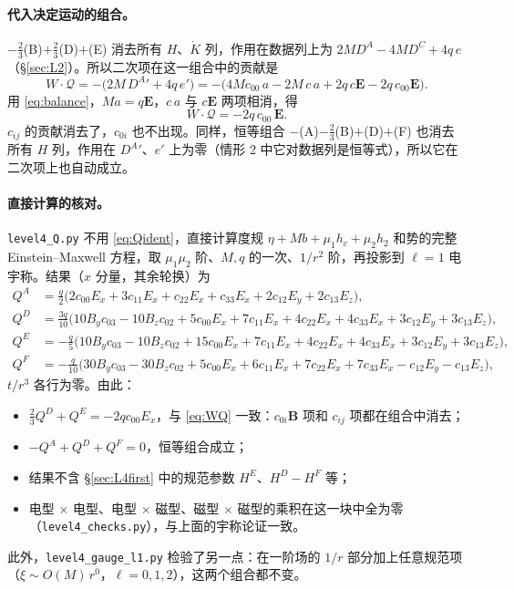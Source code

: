 \documentclass[11pt,a4paper]{ctexart}
\numberwithin{equation}{section}
\begin{document}
\paragraph{代入决定运动的组合。}$-\tfrac23$(B)$+\tfrac23$(D)$+$(E) 消去所有 $H$、$\dot K$ 列，作用在数据列上为 $2MD^A-4MD^C+4q\,e$（\S\ref{sec:L2}）。所以二次项在这一组合中的贡献是
\begin{equation*}
W\cdot\mathcal Q=-\big(2M\,D^A{}'+4q\,e'\big)
=-\big(4Mc_{00}\,a-2M\,c\,a+2q\,c\boldsymbol E-2q\,c_{00}\boldsymbol E\big).
\end{equation*}
用 \eqref{eq:balance}，$Ma=q\boldsymbol E$，$c\,a$ 与 $c\boldsymbol E$ 两项相消，得
\begin{equation}
W\cdot\mathcal Q=-2q\,c_{00}\,\boldsymbol E .
\label{eq:WQ}
\end{equation}
$c_{ij}$ 的贡献消去了，$c_{0i}$ 也不出现。同样，恒等组合 $-$(A)$-\tfrac23$(B)$+$(D)$+$(F) 也消去所有 $H$ 列，作用在 $D^A{}'$、$e'$ 上为零（情形 2 中它对数据列是恒等式），所以它在二次项上也自动成立。

\paragraph{直接计算的核对。}\texttt{level4\_Q.py} 不用 \eqref{eq:Qident}，直接计算度规 $\eta+Mb+\mu_1h_c+\mu_2h_2$ 和势的完整 Einstein--Maxwell 方程，取 $\mu_1\mu_2$ 阶、$M,q$ 的一次、$1/r^2$ 阶，再投影到 $\ell=1$ 电宇称。结果（$x$ 分量，其余轮换）为
\begin{align*}
Q^A&=\tfrac q2\big(2c_{00}E_x+3c_{11}E_x+c_{22}E_x+c_{33}E_x+2c_{12}E_y+2c_{13}E_z\big),\\
Q^D&=\tfrac{3q}{10}\big(10B_yc_{03}-10B_zc_{02}+5c_{00}E_x+7c_{11}E_x+4c_{22}E_x+4c_{33}E_x+3c_{12}E_y+3c_{13}E_z\big),\\
Q^E&=-\tfrac q5\big(10B_yc_{03}-10B_zc_{02}+15c_{00}E_x+7c_{11}E_x+4c_{22}E_x+4c_{33}E_x+3c_{12}E_y+3c_{13}E_z\big),\\
Q^F&=-\tfrac q{10}\big(30B_yc_{03}-30B_zc_{02}+5c_{00}E_x+6c_{11}E_x+7c_{22}E_x+7c_{33}E_x-c_{12}E_y-c_{13}E_z\big),
\end{align*}
$t/r^3$ 各行为零。由此：
\begin{itemize}
\item $\tfrac23Q^D+Q^E=-2qc_{00}E_x$，与 \eqref{eq:WQ} 一致：$c_{0i}\boldsymbol B$ 项和 $c_{ij}$ 项都在组合中消去；
\item $-Q^A+Q^D+Q^F=0$，恒等组合成立；
\item 结果不含 \S\ref{sec:L4first} 中的规范参数 $H^E$、$H^D-H^F$ 等；
\item 电型 $\times$ 电型、电型 $\times$ 磁型、磁型 $\times$ 磁型的乘积在这一块中全为零（\texttt{level4\_checks.py}），与上面的宇称论证一致。
\end{itemize}
此外，\texttt{level4\_gauge\_l1.py} 检验了另一点：在一阶场的 $1/r$ 部分加上任意规范项（$\xi\sim O(M)\,r^0$，$\ell=0,1,2$），这两个组合都不变。
\end{document}
